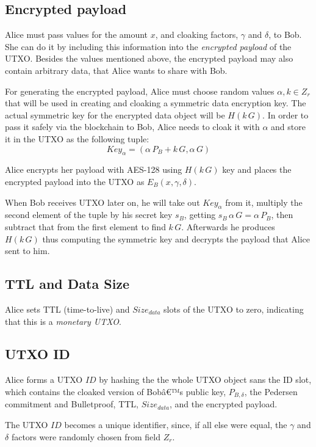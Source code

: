 \documentclass[8pt,fleqn,openany]{book}
\begin{document}
{		\subsection{Encrypted payload} Alice must pass values for the amount $x$, and cloaking factors, $\gamma$ and $\delta$, to Bob. She can do it by including this information into the \textit{encrypted payload} of the UTXO. Besides the values mentioned above, the encrypted payload may also contain arbitrary data, that Alice wants to share with Bob. 
		
		For generating the encrypted payload, Alice must choose random values $\alpha, k \in Z_r$ that will be used in creating and cloaking a symmetric data encryption key.
		The actual symmetric key for the encrypted data object will be $H(k \, G)$. In order to pass it safely via the blockchain to Bob, Alice needs to cloak it with $\alpha$ and store it in the UTXO as the following tuple: $$\mathit{Key}_{\alpha} = (\alpha \, P_{B} + k \, G, \alpha \, G )$$ 
		
		Alice encrypts her payload with AES-128 using $H(k \, G)$ key and places the encrypted payload into the UTXO as $E_B(x, \gamma, \delta)$.
		
		When Bob receives UTXO later on, he will take out $\mathit{Key}_{\alpha}$ from it, multiply the second element of the tuple by his secret key $s_B$, getting $s_B \, \alpha \, G = \alpha \, P_B$, then subtract that from the first element to find $k \, G$. Afterwards he produces $H(k \, G)$ thus computing the symmetric key and decrypts the payload that Alice sent to him.
		
		\subsection{TTL and Data Size} Alice sets TTL (time-to-live) and $Size_{data}$ slots of the UTXO to zero, indicating that this is a \textit{monetary UTXO}. 
		
		\subsection{UTXO ID} Alice forms a UTXO $\mathit{ID}$ by hashing the the whole UTXO object sans the ID slot, which contains the cloaked version of Bobâ€™s public key, $P_{B, \delta}$, the Pedersen commitment and Bulletproof, TTL, $Size_{data}$, and the encrypted payload.
		
		The UTXO $\mathit{ID}$ becomes a unique identifier, since, if all else were equal, the $\gamma$ and $\delta$ factors were randomly chosen from field $Z_r$.
		
}
\end{document}
